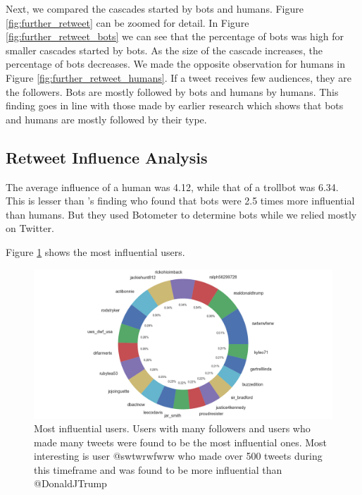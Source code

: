 \documentclass[letterpaper]{article}
\begin{document}
Next, we compared the cascades started by bots and humans. Figure \ref{fig:further_retweet} can be zoomed 
for detail. In Figure \ref{fig:further_retweet_bots} we can see that the percentage of bots was high for smaller cascades 
started by bots. As the size of the cascade increases, the percentage of bots decreases. 
We made the opposite observation for humans in Figure \ref{fig:further_retweet_humans}. If a tweet receives 
few audiences, they are the followers. Bots are mostly
followed by bots and humans by humans. This finding goes in line with those made by earlier research which
 shows that bots and humans are mostly followed by their type. \par

\subsection{Retweet Influence Analysis}

The average influence of a human was 4.12, while that of a trollbot was 6.34. This is lesser than 
\cite{rizoiu2018debatenight}'s finding who found that bots were 2.5 times more influential than humans. 
But they used Botometer to determine bots while we relied mostly on Twitter.

Figure \ref{fig:humans_bots_percentage} shows the most influential users. 

\par

\begin{figure}[H]
    \includegraphics[width=\linewidth]{images/top_influences.png}
    \caption{Most influential users. Users with many followers and users who made many tweets were found to be the most influential ones. Most interesting is user @swtwrwfwrw who made over 500 tweets during this timeframe and was found to be more influential than @DonaldJTrump}
    \label{fig:humans_bots_percentage}
\end{figure}
\end{document}

